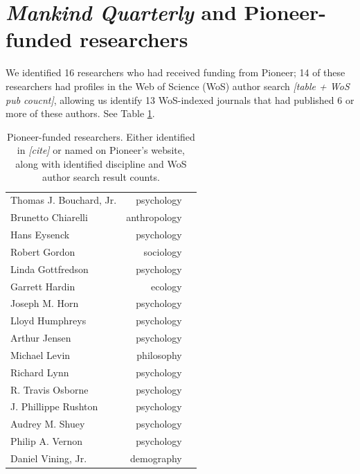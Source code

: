 \documentclass[12pt]{article}
\begin{document}
\hypertarget{mankind-quarterly-and-pioneer-funded-researchers}{%
\section*{\texorpdfstring{\emph{Mankind Quarterly} and Pioneer-funded researchers}{Mankind Quarterly and Pioneer-funded researchers}}\label{mankind-quarterly-and-pioneer-funded-researchers}}

We identified 16 researchers who had received funding from Pioneer; 14 of these researchers had profiles in the Web of Science (WoS) author search \emph{{[}table + WoS pub coucnt{]}}, allowing us identify 13 WoS-indexed journals that had published 6 or more of these authors. See Table \ref{tab:researchers}.

\begin{longtable}[]{@{}lrl@{}}
\caption{\label{tab:researchers} Pioneer-funded researchers. Either identified in \emph{{[}cite{]}} or named on Pioneer's website, along with identified discipline and WoS author search result counts.}\tabularnewline
\toprule
\endhead
Thomas J. Bouchard, Jr. & psychology & \\
Brunetto Chiarelli & anthropology & \\
Hans Eysenck & psychology & \\
Robert Gordon & sociology & \\
Linda Gottfredson & psychology & \\
Garrett Hardin & ecology & \\
Joseph M. Horn & psychology & \\
Lloyd Humphreys & psychology & \\
Arthur Jensen & psychology & \\
Michael Levin & philosophy & \\
Richard Lynn & psychology & \\
R. Travis Osborne & psychology & \\
J. Phillippe Rushton & psychology & \\
Audrey M. Shuey & psychology & \\
Philip A. Vernon & psychology & \\
Daniel Vining, Jr. & demography & \\
\bottomrule
\end{longtable}
\end{document}
